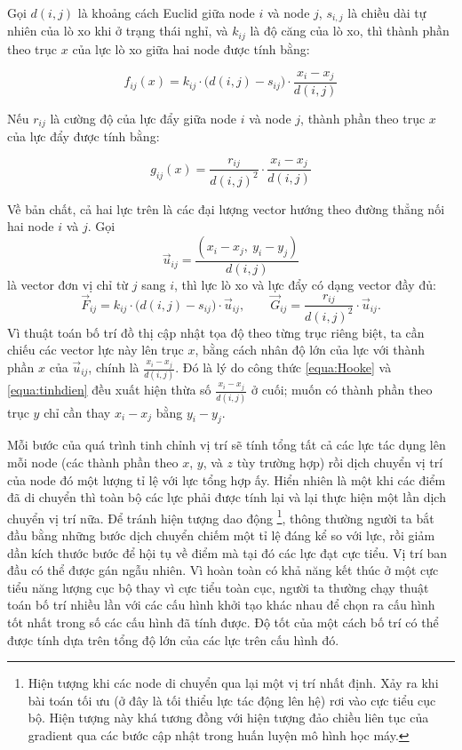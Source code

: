 \documentclass[12pt,a4paper, openany]{book}
\begin{document}
Gọi $d(i, j)$ là khoảng cách Euclid giữa node $i$ và node $j$, $s_{i,j}$ là chiều dài tự nhiên của lò xo khi ở trạng thái nghỉ, và $k_{ij}$ là độ căng của lò xo, thì thành phần theo trục $x$ của lực lò xo giữa hai node được tính bằng:

\begin{equation}
f_{ij}(x) = k_{ij} \cdot \big(d(i,j) - s_{ij}\big) \cdot \frac{x_i - x_j}{d(i,j)} 
\label{equa:Hooke}
\end{equation}

Nếu $r_{ij}$ là cường độ của lực đẩy giữa node $i$ và node $j$, thành phần theo trục $x$ của lực đẩy được tính bằng:

\begin{equation}
g_{ij}(x) = \frac{r_{ij}}{d(i,j)^2} \cdot \frac{x_i - x_j}{d(i,j)}
\label{equa:tinhdien}
\end{equation}

Về bản chất, cả hai lực trên là các đại lượng vector hướng theo đường thẳng
nối hai node $i$ và $j$. Gọi
\[
  \vec{u}_{ij} = \frac{(x_i - x_j,\ y_i - y_j)}{d(i,j)}
\]
là vector đơn vị chỉ từ $j$ sang $i$, thì lực lò xo và lực đẩy có dạng
vector đầy đủ:
\[
  \vec{F}_{ij} = k_{ij} \cdot \big(d(i,j) - s_{ij}\big) \cdot \vec{u}_{ij},
  \qquad
  \vec{G}_{ij} = \frac{r_{ij}}{d(i,j)^2} \cdot \vec{u}_{ij}.
\]
Vì thuật toán bố trí đồ thị cập nhật tọa độ theo từng trục riêng biệt, ta
cần chiếu các vector lực này lên trục $x$, bằng cách nhân độ lớn của lực
với thành phần $x$ của $\vec{u}_{ij}$, chính là $\frac{x_i - x_j}{d(i,j)}$.
Đó là lý do công thức \ref{equa:Hooke} và \ref{equa:tinhdien} đều xuất hiện thừa số
$\frac{x_i - x_j}{d(i,j)}$ ở cuối; muốn có thành phần theo trục $y$ chỉ
cần thay $x_i - x_j$ bằng $y_i - y_j$.

Mỗi bước của quá trình tinh chỉnh vị trí sẽ tính tổng tất cả các lực tác dụng lên mỗi node (các thành phần theo $x$, $y$, và $z$ tùy trường hợp) rồi dịch chuyển vị trí của node đó một lượng tỉ lệ với lực tổng hợp ấy. Hiển nhiên là một khi các điểm đã di chuyển thì toàn bộ các lực phải được tính lại và lại thực hiện một lần dịch chuyển vị trí nữa. Để tránh hiện tượng dao động \footnote{Hiện tượng khi các node di chuyển qua lại một vị trí nhất định. Xảy ra khi bài toán tối ưu (ở đây là tối thiểu lực tác động lên hệ) rơi vào cực tiểu cục bộ. Hiện tượng này khá tương đồng với hiện tượng đảo chiều liên tục của gradient qua các bước cập nhật trong huấn luyện mô hình học máy.}, thông thường người ta bắt đầu bằng những bước dịch chuyển chiếm một tỉ lệ đáng kể so với lực, rồi giảm dần kích thước bước để hội tụ về điểm mà tại đó các lực đạt cực tiểu. Vị trí ban đầu có thể được gán ngẫu nhiên. Vì hoàn toàn có khả năng kết thúc ở một cực tiểu năng lượng cục bộ thay vì cực tiểu toàn cục, người ta thường chạy thuật toán bố trí nhiều lần với các cấu hình khởi tạo khác nhau để chọn ra cấu hình tốt nhất trong số các cấu hình đã tính được. Độ tốt của một cách bố trí có thể được tính dựa trên tổng độ lớn của các lực trên cấu hình đó.
\end{document}
